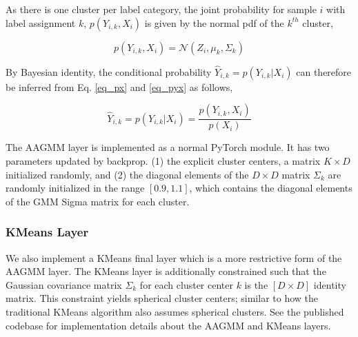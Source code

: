 \documentclass[10pt,twocolumn,letterpaper]{article}
\begin{document}
As there is one cluster per label category, the joint probability for sample $i$ with label assignment $k$, $p(Y_{i,k},X_i)$ is given by the normal pdf of the $k^{th}$ cluster,

\begin{equation}
	\label{eq_pyx}
	p(Y_{i,k},X_i) = \mathcal{N} (Z_i, \mu_{k}, \Sigma_k) \end{equation}

By Bayesian identity, the conditional probability $\hat{Y}_{i,k}=p(Y_{i,k}|X_i)$ can therefore be inferred from Eq. \ref{eq_px} and \ref{eq_pyx} as follows,

\begin{equation}
	\hat{Y}_{i,k} = p(Y_{i,k}|X_i) = \frac{p(Y_{i,k}, X_i)}{p(X_i)}
	\label{eq_conditional}
\end{equation}

The AAGMM layer is implemented as a normal PyTorch \cite{pytorch} module.
It has two parameters updated by backprop.
(1) the explicit cluster centers, a matrix $K \times D$ initialized randomly, and
(2) the diagonal elements of the $D \times D$ matrix $\Sigma_k$ are randomly initialized in the range $[0.9, 1.1]$, which contains the diagonal elements of the GMM Sigma matrix for each cluster.

\subsubsection{KMeans Layer}

We also implement a KMeans final layer which is a more restrictive form of the AAGMM layer.
The KMeans layer is additionally constrained such that the Gaussian covariance matrix $\Sigma_k$ for each cluster center $k$ is the $[D \times D]$ identity matrix. 
This constraint yields spherical cluster centers; similar to how the traditional KMeans algorithm also assumes spherical clusters.
See the published codebase for implementation details about the AAGMM and KMeans layers.

\end{document}
